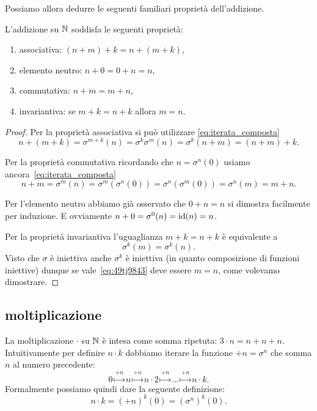 Possiamo allora dedurre le seguenti familiari proprietà dell'addizione.
\begin{theorem}
  L'addizione su ${\mathbb N}$ soddisfa le seguenti 
  proprietà:
  \begin{enumerate}
    \item associativa: $(n+m)+k = n + (m + k)$,
    \item elemento neutro: $n+0 = 0+n = n$,
    \item commutativa: $n+m = m+n$,
    \item invariantiva: se $m+k = n+k$ allora $m=n$.
  \end{enumerate}
\end{theorem}
\begin{proof}
Per la proprietà associativa si può utilizzare
\eqref{eq:iterata_composta}
\[
n+(m+k) 
= \sigma^{m+k}(n)
= \sigma^k \sigma^m(n) 
= \sigma^k (n+m)
= (n+m) + k.
\]

Per la proprietà commutativa ricordando che $n=\sigma^n(0)$
usiamo ancora~\eqref{eq:iterata_composta}
\[
n+m 
= \sigma^m(n)
= \sigma^m (\sigma^n (0))
= \sigma^n (\sigma^m (0)) 
= \sigma^n(m) = m+n.
\]

Per l'elemento neutro abbiamo già osservato che $0+n=n$ 
si dimostra facilmente per induzione.
E ovviamente $n+0 = \sigma^0(n) = \mathrm{id}(n) = n$.

Per la proprietà invariantiva 
l'uguaglianza $m+k = n+k$ è equivalente a 
\begin{equation}\label{eq:49tj9843}
  \sigma^k(m) = \sigma^k(n).  
\end{equation}
Visto che $\sigma$ è iniettiva anche $\sigma^k$ è iniettiva 
(in quanto composizione di funzioni iniettive)
dunque se vale~\eqref{eq:49tj9843} 
deve essere $m=n$, come volevamo dimostrare.
\end{proof}


\subsection{moltiplicazione}

La moltiplicazione $\cdot$ su ${\mathbb N}$ è intesa come somma ripetuta:
$3\cdot n = n + n + n$. 
Intuitivamente per definire $n\cdot k$ dobbiamo iterare
la funzione $+n=\sigma^n$ che somma $n$ al numero precedente:
\[
  0\stackrel{+n}\mapsto n \stackrel{+n}\mapsto n\cdot 2 
  \stackrel{+n}\mapsto \dots \stackrel{+n}\mapsto n\cdot k.
\]
Formalmente possiamo quindi dare la seguente definizione:
\[
  n\cdot k = (+n)^k(0) = (\sigma^n)^k(0).  
\]

